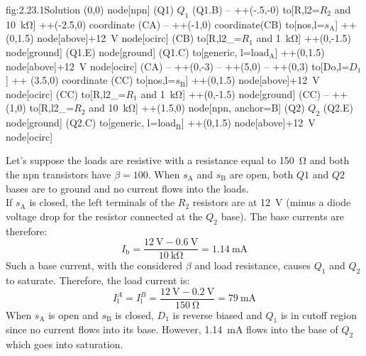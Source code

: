 \begin{circuit}{fig:2.23.1}{Solution}
    (0,0) node[npn] (Q1) {$Q_1$}
    (Q1.B) -- ++(-.5,-0)
    to[R,l2=$R_2$ and \SI{10}{\kilo\ohm}] ++(-2.5,0) coordinate (CA)
    -- ++(-1,0) coordinate(CB)
    to[nos,l=$s_\text{A}$] ++(0,1.5)
    node[above]{+\SI{12}{\volt}} node[ocirc] {}
    (CB) to[R,l2_=$R_1$ and \SI{1}{\kilo\ohm}] ++(0,-1.5)
    node[ground] {}
    (Q1.E) node[ground] {}
    (Q1.C) to[generic, l=$\text{load}_\text{A}$] ++(0,1.5)
    node[above]{+\SI{12}{\volt}} node[ocirc] {}
    (CA) -- ++(0,-3) -- ++(5,0) -- ++(0,3)
    to[Do,l=$D_1$] ++ (3.5,0) coordinate (CC)
    to[nos,l=$s_\text{B}$] ++(0,1.5)
    node[above]{+\SI{12}{\volt}} node[ocirc] {}
    (CC) to[R,l2_=$R_1$ and \SI{1}{\kilo\ohm}] ++(0,-1.5)
    node[ground] {}
    (CC) -- ++(1,0) 
    to[R,l2_=$R_2$ and \SI{10}{\kilo\ohm}] ++(1.5,0)
    node[npn, anchor=B] (Q2) {$Q_2$}
    (Q2.E) node[ground] {}
    (Q2.C) to[generic, l=$\text{load}_\text{B}$] ++(0,1.5)
    node[above]{+\SI{12}{\volt}} node[ocirc] {}
\end{circuit}
Let's suppose the loads are resistive with a resistance equal to \SI{150}{\ohm} and both the npn transistors have $\beta=100$.
When $s_\text{A}$ and $s_\text{B}$ are open, both $Q1$ and $Q2$ bases are to ground and no current flows into the loads.\\
If $s_\text{A}$ is closed, the left terminals of the $R_2$ resistors are at \SI{12}{\volt} (minus a diode voltage drop for the resistor connected at the $Q_2$ base). The base currents are therefore:
\[I_\text{b}=\frac{\SI{12}{\volt}-\SI{0.6}{\volt}}{\SI{10}{\kilo\ohm}}=\SI{1.14}{\milli\ampere}\]
Such a base current, with the considered $\beta$ and load resistance, causes $Q_1$ and $Q_2$ to saturate. Therefore, the load current is:
\[I_\text{l}^{A} = I_\text{l}^{B} = \frac{\SI{12}{\volt}-\SI{0.2}{\volt}}{\SI{150}{\ohm}}=\SI{79}{\milli\ampere}\]
When $s_\text{A}$ is open and $s_\text{B}$ is closed, $D_1$ is reverse biased and $Q_1$ is in cutoff region since no current flows into its base. However, \SI{1.14}{\milli\ampere} flows into the base of $Q_2$ which goes into saturation.







